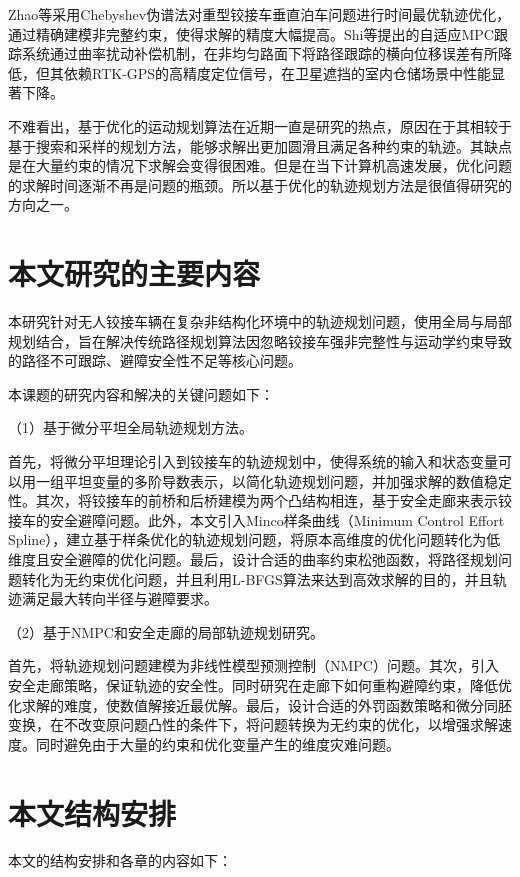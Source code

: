 \documentclass[master,academic]{ysuthesis} %
\begin{document}
	Zhao等采用Chebyshev伪谱法对重型铰接车垂直泊车问题进行时间最优轨迹优化，通过精确建模非完整约束，使得求解的精度大幅提高。Shi等提出的自适应MPC跟踪系统通过曲率扰动补偿机制，在非均匀路面下将路径跟踪的横向位移误差有所降低，但其依赖RTK-GPS的高精度定位信号，在卫星遮挡的室内仓储场景中性能显著下降。
	

	不难看出，基于优化的运动规划算法在近期一直是研究的热点，原因在于其相较于基于搜索和采样的规划方法，能够求解出更加圆滑且满足各种约束的轨迹。其缺点是在大量约束的情况下求解会变得很困难。但是在当下计算机高速发展，优化问题的求解时间逐渐不再是问题的瓶颈。所以基于优化的轨迹规划方法是很值得研究的方向之一。

	\section{本文研究的主要内容}
	本研究针对无人铰接车辆在复杂非结构化环境中的轨迹规划问题，使用全局与局部规划结合，旨在解决传统路径规划算法因忽略铰接车强非完整性与运动学约束导致的路径不可跟踪、避障安全性不足等核心问题。

	本课题的研究内容和解决的关键问题如下：

	（1）基于微分平坦全局轨迹规划方法。

	首先，将微分平坦理论引入到铰接车的轨迹规划中，使得系统的输入和状态变量可以用一组平坦变量的多阶导数表示，以简化轨迹规划问题，并加强求解的数值稳定性。其次，将铰接车的前桥和后桥建模为两个凸结构相连，基于安全走廊来表示铰接车的安全避障问题。此外，本文引入Minco样条曲线（Minimum Control Effort Spline），建立基于样条优化的轨迹规划问题，将原本高维度的优化问题转化为低维度且安全避障的优化问题。最后，设计合适的曲率约束松弛函数，将路径规划问题转化为无约束优化问题，并且利用L-BFGS算法来达到高效求解的目的，并且轨迹满足最大转向半径与避障要求。

	（2）基于NMPC和安全走廊的局部轨迹规划研究。

	首先，将轨迹规划问题建模为非线性模型预测控制（NMPC）问题。其次，引入安全走廊策略，保证轨迹的安全性。同时研究在走廊下如何重构避障约束，降低优化求解的难度，使数值解接近最优解。最后，设计合适的外罚函数策略和微分同胚变换，在不改变原问题凸性的条件下，将问题转换为无约束的优化，以增强求解速度。同时避免由于大量的约束和优化变量产生的维度灾难问题。

	\section{本文结构安排}
	本文的结构安排和各章的内容如下：
\end{document}
